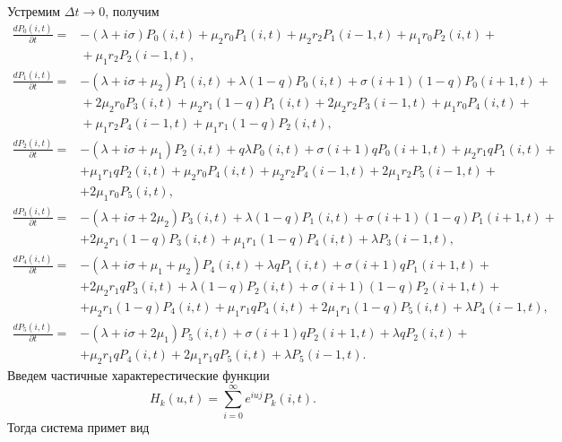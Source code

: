 Устремим $\Delta t \rightarrow 0$, получим 
\begin{align*} 
	\frac{dP_{0}(i,t)}{\partial t}=&-(\lambda+i\sigma)P_{0}(i,t)+\mu_{2}r_{0}P_{1}(i,t)+\mu_{2}r_{2}P_{1}(i-1,t)+\mu_{1}r_{0}P_{2}(i,t)+\\
	&{}+\mu_{1}r_{2}P_{2}(i-1,t),\\
	\frac{dP_{1}(i,t)}{\partial t}=&-(\lambda+i\sigma+\mu_{2})P_{1}(i,t)+\lambda(1-q)P_{0}(i,t)+\sigma(i+1)(1-q)P_{0}(i+1,t)+\\
	&{}+2\mu_{2}r_{0}P_{3}(i,t) + \mu_{2}r_{1}(1-q)P_{1}(i,t)+2\mu_{2}r_{2}P_{3}(i-1,t)+\mu_{1}r_{0}P_{4}(i,t)+\\
	&{}+\mu_{1}r_{2}P_{4}(i-1,t)+\mu_{1}r_{1}(1-q)P_{2}(i,t),\\
	\frac{dP_{2}(i,t)}{\partial t}=&-(\lambda+i\sigma+\mu_{1})P_{2}(i,t)+q\lambda P_{0}(i,t)+\sigma(i+1)qP_{0}(i+1,t)+\mu_{2}r_{1}qP_{1}(i,t)+\\
	&+\mu_{1}r_{1}qP_{2}(i,t)+\mu_{2}r_{0}P_{4}(i,t)+\mu_{2}r_{2}P_{4}(i-1,t)+2\mu_{1}r_{2}P_{5}(i-1,t)+\\
	&+2\mu_{1}r_{0}P_{5}(i,t),\\
	\frac{dP_{3}(i,t)}{\partial t}=&-(\lambda+i\sigma+2\mu_{2})P_{3}(i,t)+\lambda(1-q)P_{1}(i,t)+\sigma(i+1)(1-q)P_{1}(i+1,t)+\\
	&+2\mu_{2}r_{1}(1-q)P_{3}(i,t)+\mu_{1}r_{1}(1-q)P_{4}(i,t)+\lambda P_{3}(i-1,t),\\
	\frac{dP_{4}(i,t)}{\partial t}=&-(\lambda+i\sigma+\mu_{1}+\mu_{2})P_{4}(i,t)+\lambda qP_{1}(i,t)+\sigma(i+1)qP_{1}(i+1,t)+\\
	&+2\mu_{2}r_{1}qP_{3}(i,t)+\lambda(1-q)P_{2}(i,t)+\sigma(i+1)(1-q)P_{2}(i+1,t)+\\
	&+\mu_{2}r_{1}(1-q)P_{4}(i,t)+\mu_{1}r_{1}qP_{4}(i,t)+2\mu_{1}r_{1}(1-q)P_{5}(i,t)+\lambda P_{4}(i-1,t),\\
	\frac{dP_{5}(i,t)}{\partial t}=&-(\lambda+i\sigma+2\mu_{1})P_{5}(i,t)+\sigma(i+1)qP_{2}(i+1,t)+\lambda qP_{2}(i,t)+\\
	&+\mu_{2}r_{1}qP_{4}(i,t)+2\mu_{1}r_{1}qP_{5}(i,t)+\lambda P_{5}(i-1,t).
\end{align*} 
Введем частичные характерестические функции
$$H_{k}(u,t)=\sum_{i=0}^\infty e^{iuj}P_{k}(i,t).$$
Тогда система примет вид
